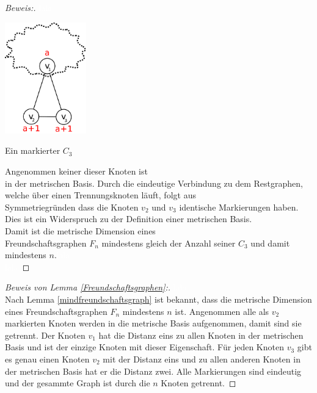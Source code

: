 \begin{proof}[Beweis:]
\textcolor{white}{lala}
\begin{floatingfigure}[l]{200pt}
\centering
\includegraphics*[width = 100pt]{bilder/freundschaftsgraphbew.pdf}
\caption{Ein markierter $C_{3}$}
\end{floatingfigure}
Angenommen keiner dieser Knoten ist\\in der metrischen Basis. Durch die eindeutige Verbindung zu dem Restgraphen, welche über einen Trennungsknoten läuft, folgt aus\\Symmetriegründen dass die Knoten $v_{2}$ und $v_{3}$ identische Markierungen haben.\\Dies ist ein Widerspruch zu der Definition einer metrischen Basis.\\
Damit ist die metrische Dimension eines\\Freundschaftsgraphen $F_n$ mindestens gleich der Anzahl seiner $C_{3}$ und damit mindestens $n$.\textcolor{white}{lala}\\\textcolor{white}{lala}
\end{proof}
\vspace{-6mm}
\begin{proof}[Beweis von Lemma \ref{Freundschaftsgraphen}:]
\textcolor{white}{lala}\\
Nach Lemma \ref{mindfreundschaftsgraph} ist bekannt, dass die metrische Dimension eines Freundschaftsgraphen $F_n$ mindestens $n$ ist. Angenommen alle als $v_2$ markierten Knoten werden in die metrische Basis aufgenommen, damit sind sie getrennt. Der Knoten $v_1$ hat die Distanz eins zu allen Knoten in der metrischen Basis und ist der einzige Knoten mit dieser Eigenschaft. Für jeden Knoten $v_3$ gibt es genau einen Knoten $v_2$ mit der Distanz eins und zu allen anderen Knoten in der metrischen Basis hat er die Distanz zwei. Alle Markierungen sind eindeutig und der gesammte Graph ist durch die $n$ Knoten getrennt.
\end{proof}

